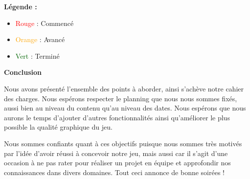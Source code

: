 \documentclass[a4paper, 11pt]{report}
\begin{document}
\vspace*{7mm}
\textbf{Légende :}
\begin{itemize}
  \item \textcolor{red}{Rouge} : Commencé
  \item \textcolor{orange}{Orange} : Avancé
  \item \textcolor{darkgreen}{Vert} : Terminé
\end{itemize}

\newpage
\textbf{{\huge Conclusion}} \vspace{7mm}

Nous avons présenté l’ensemble des points à aborder, ainsi s’achève notre cahier des charges.
Nous espérons respecter le planning que nous nous sommes fixés, aussi bien au niveau du contenu qu’au niveau des dates. Nous espérons que nous aurons le temps d’ajouter d’autres fonctionnalités ainsi qu’améliorer le plus possible la qualité graphique du jeu.

Nous sommes confiants quant à ces objectifs puisque nous sommes très motivés par l’idée d’avoir réussi à concevoir notre jeu, mais aussi car il s’agit d’une occasion à ne pas rater pour réaliser un projet en équipe et approfondir nos connaissances dans divers domaines. Tout ceci annonce de bonne soirées !
\end{document}
